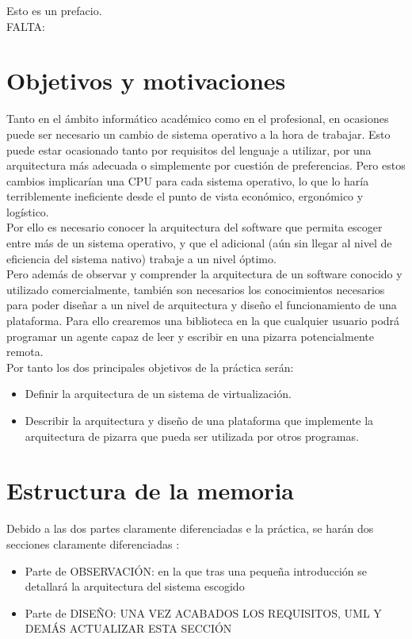 \lettrine[lines=1,slope=4pt,findent=0pt]{E}{}sto es un prefacio.\\

\color{red}
FALTA:
\color{black}
\section{Objetivos y motivaciones}
Tanto en el ámbito informático académico como en el profesional, en ocasiones puede ser necesario un cambio de sistema operativo a la hora de trabajar. Esto puede estar ocasionado tanto por requisitos del lenguaje a utilizar, por una arquitectura más adecuada o simplemente por cuestión de preferencias. Pero estos cambios implicarían una CPU para cada sistema operativo, lo que lo haría terriblemente ineficiente desde el punto de vista económico, ergonómico y logístico. \\
Por ello es necesario conocer la arquitectura del software que permita escoger entre más de un sistema operativo, y que el adicional (aún sin llegar al nivel de eficiencia del sistema nativo) trabaje a un nivel óptimo.\\
Pero además de observar y comprender la arquitectura de un software conocido y utilizado comercialmente, también son necesarios los conocimientos necesarios para poder diseñar a un nivel de arquitectura y diseño el funcionamiento de una plataforma. Para ello crearemos una biblioteca en la que cualquier usuario podrá programar un agente capaz de leer y escribir en una pizarra potencialmente remota.\\
Por tanto los dos principales objetivos de la práctica serán:
\begin{itemize}
\item Definir la arquitectura de un sistema de virtualización.
\item Describir la arquitectura y diseño de una plataforma que implemente la arquitectura de pizarra que pueda ser utilizada por otros programas.
\end{itemize}

\section{Estructura de la memoria}
Debido a las dos partes claramente diferenciadas e la práctica, se harán dos secciones claramente diferenciadas :
\begin{itemize}
\item Parte de OBSERVACIÓN: en la que tras una pequeña introducción se detallará la arquitectura del sistema escogido
\item Parte de DISEÑO: \color{red} UNA VEZ ACABADOS LOS REQUISITOS, UML Y DEMÁS ACTUALIZAR ESTA SECCIÓN
\end{itemize}

